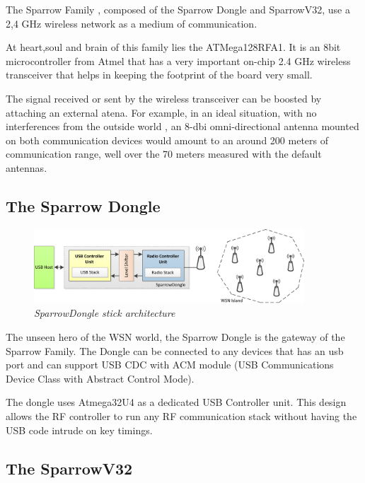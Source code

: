 The Sparrow Family , composed of the Sparrow Dongle and SparrowV32, use a 2,4 GHz wireless network as a medium of communication. 

At heart,soul and brain of this family lies the ATMega128RFA1. It is an 8bit microcontroller from Atmel that has a very important on-chip 2.4 GHz wireless transceiver that helps in keeping the footprint of the board very small.

The signal received or sent by the wireless transceiver can be boosted by attaching an external atena. For example, in an ideal situation, with no interferences from the outside world , an 8-dbi omni-directional antenna mounted on both communication devices would amount to an around 200 meters of communication range, well over the 70 meters measured with the default antennas.

\subsection{The Sparrow Dongle}

\begin{figure}[ht]
\begin{center}
\includegraphics[width=0.9\textwidth]{hw_platform/donge_architecture.png}
\end{center}
\caption{\small \itshape{SparrowDongle stick architecture}}
\end{figure}

The unseen hero of the WSN world, the Sparrow Dongle is the gateway of the Sparrow Family. The Dongle can be connected to any devices that has an usb port and can support USB CDC with ACM module (USB Communications Device Class with Abstract Control Mode). 

The dongle uses Atmega32U4 as a dedicated USB Controller unit. This design allows the RF controller to run any RF communication stack without having the USB code intrude on key timings.


\subsection{The SparrowV32}

